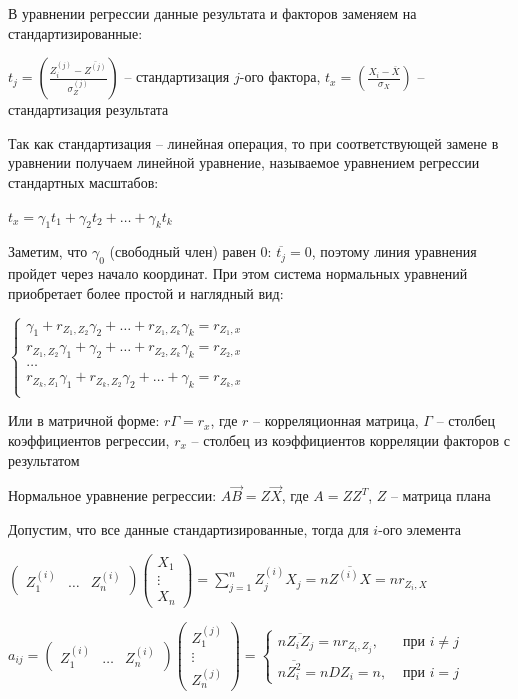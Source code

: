 В уравнении регрессии данные результата и факторов заменяем на стандартизированные: 

$t_j = \left(\frac{Z^{(j)}_i - \overline{Z^{(j)}}}{\sigma_{Z}^{(j)}}\right)$ -- стандартизация $j$-ого фактора, $t_x = \left(\frac{X_i - \overline{X}}{\sigma_X}\right)$ -- стандартизация результата

Так как стандартизация -- линейная операция, то при соответствующей замене в уравнении получаем линейной уравнение,
называемое уравнением регрессии стандартных масштабов:

$t_x = \gamma_1 t_1 + \gamma_2 t_2 + \dots + \gamma_k t_k$

\Nota Заметим, что $\gamma_0$ (свободный член) равен 0: $\overline{t_j} = 0$, поэтому линия уравнения пройдет через начало координат.
При этом система нормальных уравнений приобретает более простой и наглядный вид:

\smallvspace

$\begin{cases}
    \gamma_1 + r_{Z_1, Z_2} \gamma_2 + \dots + r_{Z_1, Z_k} \gamma_k = r_{Z_1, x} \\
    r_{Z_1, Z_2} \gamma_1 + \gamma_2 + \dots + r_{Z_2, Z_k} \gamma_k = r_{Z_2, x} \\
    \dots \\
    r_{Z_k, Z_1} \gamma_1 + r_{Z_k, Z_2} \gamma_2 + \dots + \gamma_k = r_{Z_k, x} \\
\end{cases}$

\smallvspace

Или в матричной форме: $r \Gamma = r_x$, где $r$ -- корреляционная матрица, $\Gamma$ -- столбец коэффициентов регрессии, $r_x$ -- столбец из коэффициентов корреляции факторов с результатом

Нормальное уравнение регрессии: $A \vec B = Z \vec X$, где $A = Z Z^T$, $Z$ -- матрица плана

Допустим, что все данные стандартизированные, тогда для $i$-ого элемента

$\begin{pmatrix}Z_1^{(i)} & \dots & Z_n^{(i)}\end{pmatrix} \begin{pmatrix}X_1 \\ \vdots \\ X_n\end{pmatrix} = 
\sum_{j = 1}^n Z^{(i)}_j X_j = n \overline{Z^{(i)} X} = n r_{Z_i, X}$

$a_{ij} = \begin{pmatrix}Z_1^{(i)} & \dots & Z_n^{(i)}\end{pmatrix} \begin{pmatrix}Z_1^{(j)} \\ \vdots \\ Z_n^{(j)}\end{pmatrix} = 
\begin{cases}
    n \overline{Z_i Z_j} = n r_{Z_i, Z_j}, & \text{ при } i \neq j \\
    n \overline{Z_i^2} = n D Z_i = n, & \text{ при } i = j
\end{cases}$

